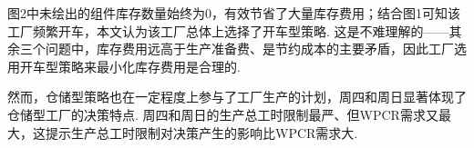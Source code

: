 图2中未绘出的组件库存数量始终为0，有效节省了大量库存费用；结合图1可知该工厂频繁开车，本文认为该工厂总体上选择了开车型策略.
这是不难理解的——其余三个问题中，库存费用远高于生产准备费、是节约成本的主要矛盾，因此工厂选用开车型策略来最小化库存费用是合理的.

然而，仓储型策略也在一定程度上参与了工厂生产的计划，周四和周日显著体现了仓储型工厂的决策特点.
周四和周日的生产总工时限制最严、但WPCR需求又最大，这提示生产总工时限制对决策产生的影响比WPCR需求大.







